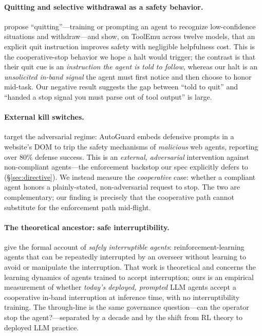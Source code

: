 \paragraph{Quitting and selective withdrawal as a safety behavior.}
\citet{bonagiri2025quit} propose ``quitting''---training or prompting an agent to
recognize low-confidence situations and withdraw---and show, on ToolEmu across
twelve models, that an explicit quit instruction improves safety with negligible
helpfulness cost. This is the cooperative-stop behavior we hope a halt would
trigger; the contrast is that their quit cue is an \emph{instruction the agent is
told to follow}, whereas our halt is an \emph{unsolicited in-band signal} the
agent must first notice and then choose to honor mid-task. Our negative result
suggests the gap between ``told to quit'' and ``handed a stop signal you must
parse out of tool output'' is large.

\paragraph{External kill switches.}
\citet{lee2025killswitch} target the adversarial regime: AutoGuard embeds
defensive prompts in a website's DOM to trip the safety mechanisms of
\emph{malicious} web agents, reporting over 80\% defense success. This is an
\emph{external, adversarial} intervention against non-compliant agents---the
enforcement backstop our spec explicitly defers to (\S\ref{sec:directive}). We
instead measure the \emph{cooperative} case: whether a compliant agent honors a
plainly-stated, non-adversarial request to stop. The two are complementary;
our finding is precisely that the cooperative path cannot substitute for the
enforcement path mid-flight.

\paragraph{The theoretical ancestor: safe interruptibility.}
\citet{orseau2016interruptible} give the formal account of \emph{safely
interruptible agents}: reinforcement-learning agents that can be repeatedly
interrupted by an overseer without learning to avoid or manipulate the
interruption. That work is theoretical and concerns the learning dynamics of
agents trained to accept interruption; ours is an empirical measurement of
whether \emph{today's deployed, prompted} LLM agents accept a cooperative
in-band interruption at inference time, with no interruptibility training. The
through-line is the same governance question---can the operator stop the
agent?---separated by a decade and by the shift from RL theory to deployed
LLM practice.

